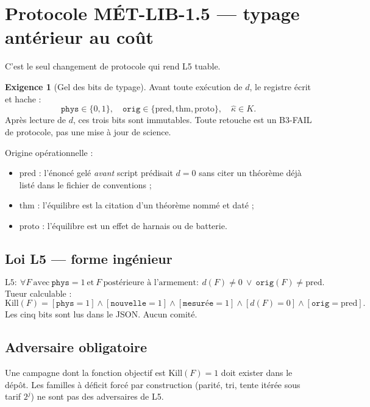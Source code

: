 \documentclass[11pt,a4paper]{article}
\theoremstyle{definition}
\newtheorem{exigence}{Exigence}
\begin{document}
\section{Protocole MÉT-LIB-1.5 --- typage antérieur au coût}
\label{sec:metlib}

C'est le seul changement de protocole qui rend L5 tuable.

\begin{exigence}[Gel des bits de typage]
Avant toute exécution de \(d\), le registre écrit et hache :
\begin{equation}
  \texttt{phys}\in\{0,1\},
  \quad
  \texttt{orig}\in\{\mathrm{pred},\mathrm{thm},\mathrm{proto}\},
  \quad
  \hat\kappa\in K.
\end{equation}
Après lecture de \(d\), ces trois bits sont immutables. Toute retouche est un B3-FAIL de protocole, pas une mise à jour de science.
\end{exigence}

Origine opérationnelle :
\begin{itemize}
  \item \(\mathrm{pred}\) : l'énoncé gelé \emph{avant} script prédisait \(d=0\) sans citer un théorème déjà listé dans le fichier de conventions ;
  \item \(\mathrm{thm}\) : l'équilibre est la citation d'un théorème nommé et daté ;
  \item \(\mathrm{proto}\) : l'équilibre est un effet de harnais ou de batterie.
\end{itemize}

\subsection{Loi L5 --- forme ingénieur}
\[
\mathrm{L5}:\
\forall F\ \text{avec}\ \texttt{phys}=1\ \text{et}\ F\ \text{postérieure à l'armement}:
\ d(F)\neq 0
\ \lor\
\texttt{orig}(F)\neq\mathrm{pred}.
\]
Tueur calculable :
\begin{equation}
\mathrm{Kill}(F)
=
[\texttt{phys}=1]
\land
[\texttt{nouvelle}=1]
\land
[\texttt{mesurée}=1]
\land
[d(F)=0]
\land
[\texttt{orig}=\mathrm{pred}].
\end{equation}
Les cinq bits sont lus dans le JSON. Aucun comité.

\subsection{Adversaire obligatoire}
Une campagne dont la fonction objectif est \(\mathrm{Kill}(F)=1\) doit exister dans le dépôt. Les familles à déficit forcé par construction (parité, tri, tente itérée sous tarif \(2^{j}\)) ne sont pas des adversaires de L5.
\end{document}
